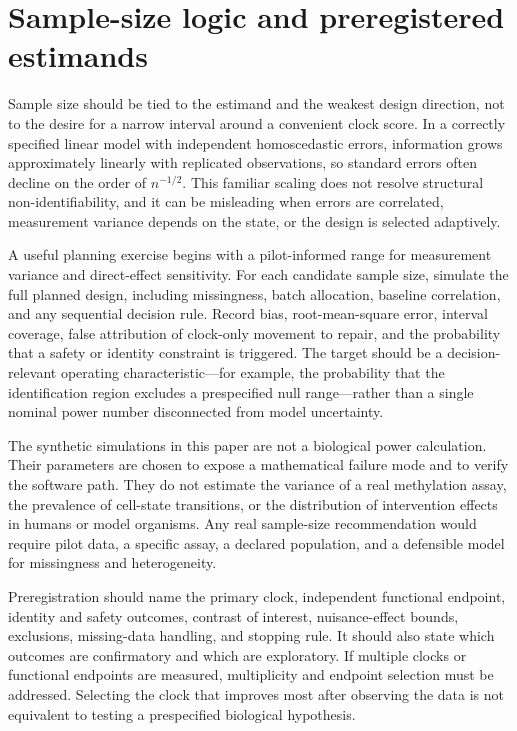 \documentclass[10pt,a4paper]{article}
\begin{document}
\section{Sample-size logic and preregistered estimands}
Sample size should be tied to the estimand and the weakest design direction, not to the desire for a narrow interval around a convenient clock score. In a correctly specified linear model with independent homoscedastic errors, information grows approximately linearly with replicated observations, so standard errors often decline on the order of \(n^{-1/2}\). This familiar scaling does not resolve structural non-identifiability, and it can be misleading when errors are correlated, measurement variance depends on the state, or the design is selected adaptively.

A useful planning exercise begins with a pilot-informed range for measurement variance and direct-effect sensitivity. For each candidate sample size, simulate the full planned design, including missingness, batch allocation, baseline correlation, and any sequential decision rule. Record bias, root-mean-square error, interval coverage, false attribution of clock-only movement to repair, and the probability that a safety or identity constraint is triggered. The target should be a decision-relevant operating characteristic—for example, the probability that the identification region excludes a prespecified null range—rather than a single nominal power number disconnected from model uncertainty.

The synthetic simulations in this paper are not a biological power calculation. Their parameters are chosen to expose a mathematical failure mode and to verify the software path. They do not estimate the variance of a real methylation assay, the prevalence of cell-state transitions, or the distribution of intervention effects in humans or model organisms. Any real sample-size recommendation would require pilot data, a specific assay, a declared population, and a defensible model for missingness and heterogeneity.

Preregistration should name the primary clock, independent functional endpoint, identity and safety outcomes, contrast of interest, nuisance-effect bounds, exclusions, missing-data handling, and stopping rule. It should also state which outcomes are confirmatory and which are exploratory. If multiple clocks or functional endpoints are measured, multiplicity and endpoint selection must be addressed. Selecting the clock that improves most after observing the data is not equivalent to testing a prespecified biological hypothesis.
\end{document}

